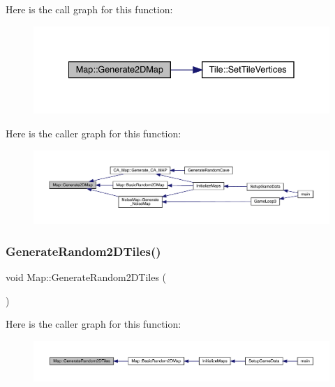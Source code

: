 Here is the call graph for this function\+:
\nopagebreak
\begin{figure}[H]
\begin{center}
\leavevmode
\includegraphics[width=335pt]{dd/d11/class_map_a6e7c6b33a4b312d325eb7079f651b414_cgraph}
\end{center}
\end{figure}
Here is the caller graph for this function\+:
\nopagebreak
\begin{figure}[H]
\begin{center}
\leavevmode
\includegraphics[width=350pt]{dd/d11/class_map_a6e7c6b33a4b312d325eb7079f651b414_icgraph}
\end{center}
\end{figure}
\mbox{\label{class_map_a9fe61ffc95d4fc4bed052ead1c06221a}} 
\subsubsection{\texorpdfstring{Generate\+Random2\+D\+Tiles()}{GenerateRandom2DTiles()}}
{\footnotesize\ttfamily void Map\+::\+Generate\+Random2\+D\+Tiles (\begin{DoxyParamCaption}{ }\end{DoxyParamCaption})}

Here is the caller graph for this function\+:
\nopagebreak
\begin{figure}[H]
\begin{center}
\leavevmode
\includegraphics[width=350pt]{dd/d11/class_map_a9fe61ffc95d4fc4bed052ead1c06221a_icgraph}
\end{center}
\end{figure}
\mbox{\label{class_map_ae9cd08e70d2549c046acbfab085d421c}} 
